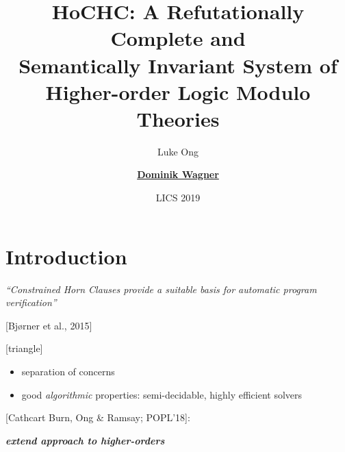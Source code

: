 \documentclass{beamer}
\begin{document}
\title[HoCHC]{
  \textbf{HoCHC: A Refutationally Complete and\\
    Semantically Invariant System of\\
    Higher-order Logic Modulo Theories}
}
\author{Luke Ong\and\textbf{ \underline{Dominik Wagner}}}
\date[LICS 2019]{LICS 2019}

\frame{\titlepage}

\section{Introduction}

\begin{frame}
  \hspace{-0.8cm}
    
  \textit{\LARGE\color{oxlighterblue}
    ``Constrained Horn Clauses provide a \emph{suitable} basis for automatic program verification''
  }

    \hspace{3.4cm}\hfill [Bj{\o}rner et al., 2015]

  [triangle]
  \vspace{1cm}
  {
    \begin{itemize}
    \item separation of concerns
    \item good \emph{algorithmic} properties: semi-decidable, highly efficient solvers
    \end{itemize}
  }
  
  \vspace{0.5cm}
  {[Cathcart Burn, Ong \& Ramsay; POPL'18]:

    {\large
    \textbf{\textit{\color{oxlighterblue}extend approach to \emph{higher-orders}}}}
  }

\end{frame}
\end{document}
